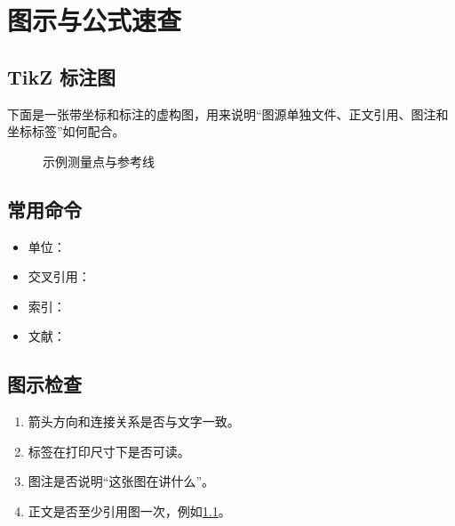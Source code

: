 \chapter{图示与公式速查}\label{app:figures}

\section{TikZ 标注图}

下面是一张带坐标和标注的虚构图，用来说明“图源单独文件、正文引用、图注和坐标标签”如何配合。

\begin{figure}[htbp]
  \centering
  
  \caption{示例测量点与参考线}\label{fig:annotated}
\end{figure}

\section{常用命令}

\begin{itemize}[leftmargin=1.6em]
  \item 单位：
  \item 交叉引用：
  \item 索引：
  \item 文献：
\end{itemize}

\section{图示检查}

\begin{enumerate}[leftmargin=1.8em]
  \item 箭头方向和连接关系是否与文字一致。
  \item 标签在打印尺寸下是否可读。
  \item 图注是否说明“这张图在讲什么”。
  \item 正文是否至少引用图一次，例如\cref{fig:annotated}。
\end{enumerate}
